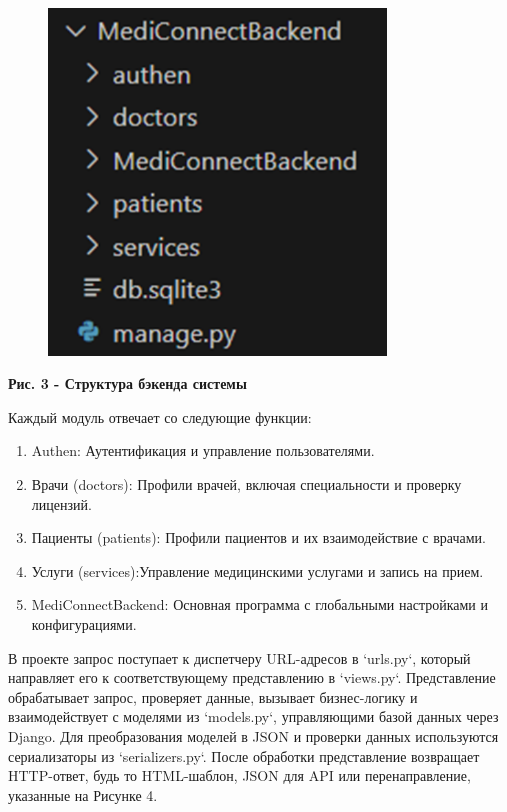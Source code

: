 \begin{figure}[H]
	\centering
	\includegraphics[width=0.8\textwidth]{assets/153}
	\caption*{}
\end{figure}

{\bfseries Рис. 3 - Структура бэкенда системы}

Каждый модуль отвечает со следующие функции:

\begin{enumerate}
\def\labelenumi{\arabic{enumi}.}
\item
  Authen: Аутентификация и управление пользователями.
\item
  Врачи (doctors): Профили врачей, включая специальности и проверку
  лицензий.
\item
  Пациенты (patients): Профили пациентов и их взаимодействие с врачами.
\item
  Услуги (services):Управление медицинскими услугами и запись на прием.
\item
  MediConnectBackend: Основная программа с глобальными настройками и
  конфигурациями.
\end{enumerate}

В проекте запрос поступает к диспетчеру URL-адресов в `urls.py`, который
направляет его к соответствующему представлению в `views.py`.
Представление обрабатывает запрос, проверяет данные, вызывает
бизнес-логику и взаимодействует с моделями из `models.py`, управляющими
базой данных через Django. Для преобразования моделей в JSON и проверки
данных используются сериализаторы из `serializers.py`. После обработки
представление возвращает HTTP-ответ, будь то HTML-шаблон, JSON для API
или перенаправление, указанные на Рисунке 4.

